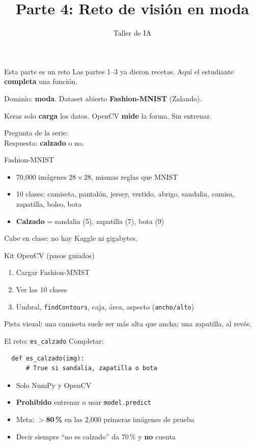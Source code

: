 \documentclass[aspectratio=169]{beamer}
\title{Parte 4: Reto de visión en moda}
\subtitle{\libreta{04\_taller\_moda.ipynb}}
\author{Taller de IA}
\begin{document}
\begin{frame}
  \titlepage
\end{frame}

\begin{frame}{Esta parte es un reto}
  Las partes 1--3 ya dieron recetas. Aquí el estudiante \textbf{completa} una función.

  Dominio: \textbf{moda}. Dataset abierto \textbf{Fashion-MNIST} (Zalando).

  Keras solo \textbf{carga} los datos. OpenCV \textbf{mide} la forma. Sin entrenar.

  Pregunta de la serie: \pregunta\\
  Respuesta: \textbf{calzado} o no.
\end{frame}

\begin{frame}{Fashion-MNIST}
  \begin{itemize}
    \item 70{,}000 imágenes $28\times28$, mismas reglas que MNIST
    \item 10 clases: camiseta, pantalón, jersey, vestido, abrigo, sandalia, camisa, zapatilla, bolso, bota
    \item \textbf{Calzado} = sandalia (5), zapatilla (7), bota (9)
  \end{itemize}

  Cabe en clase: no hay Kaggle ni gigabytes.
\end{frame}

\begin{frame}{Kit OpenCV (pasos guiados)}
  \begin{enumerate}
    \item Cargar Fashion-MNIST
    \item Ver las 10 clases
    \item Umbral, \texttt{findContours}, caja, área, aspecto (\texttt{ancho/alto})
  \end{enumerate}

  Pista visual: una camiseta suele ser más alta que ancha; una zapatilla, al revés.
\end{frame}

\begin{frame}[fragile]{El reto: \texttt{es\_calzado}}
  Completar:
  \begin{verbatim}
  def es_calzado(img):
      # True si sandalia, zapatilla o bota
  \end{verbatim}

  \begin{itemize}
    \item Solo NumPy y OpenCV
    \item \textbf{Prohibido} entrenar o usar \texttt{model.predict}
    \item Meta: \textbf{$>$80\,\%} en las 2{,}000 primeras imágenes de prueba
    \item Decir siempre ``no es calzado'' da 70\,\% y \textbf{no} cuenta
  \end{itemize}
\end{frame}
\end{document}
